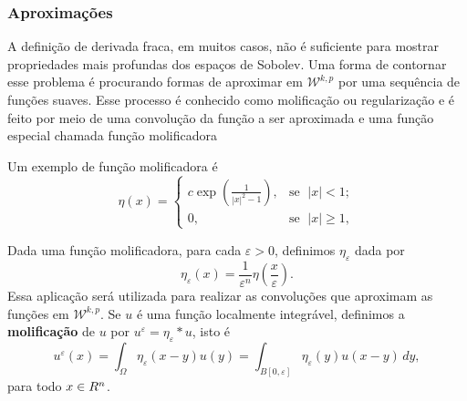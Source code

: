 \documentclass[xcolor=dvipsnames, aspectratio=169, 10pt]{beamer}
\let\mathbb\relax
\newcommand{\bR}{\mathbb{R}}
\newcommand{\cW}{\mathcal{W}}
\begin{document}
\begin{frame}
    \frametitle{Aproximações}
    A definição de derivada fraca, em muitos casos, não é suficiente para mostrar propriedades mais
    profundas dos espaços de Sobolev. Uma forma de contornar esse problema é procurando formas
    de aproximar em $\cW^{k,p}$ por uma sequência de funções suaves. Esse processo é conhecido como
    molificação ou regularização e é feito por meio de uma convolução da função a ser aproximada e
    uma função especial chamada função molificadora \pause

    Um exemplo de função molificadora é
    \begin{equation} \label{eq:molificador-friedrich}
        \eta(x) =
        \left\{
            \begin{array}{lr}
                c \exp \left( \frac{1}{|x|^2 - 1} \right), &\! \text{se }\; |x| < 1;\\
                0, &\!\text{se }\; |x| \geqslant 1,
            \end{array}
        \right.
    \end{equation}
\end{frame}
\begin{frame}
    Dada uma função molificadora, para cada $\varepsilon > 0$, definimos $\eta_\varepsilon$ dada por
    \[
        \eta_\varepsilon(x) = \frac{1}{\varepsilon^n} \eta \left( \frac{x}{\varepsilon} \right).
    \]
    Essa aplicação será utilizada para realizar as convoluções que aproximam as funções em $\cW^{k,p}$.
    Se $u$ é uma função localmente integrável, definimos a \textbf{molificação} de $u$ por $u^\varepsilon = \eta_\varepsilon * u$, isto é
    \[
        u^\varepsilon(x) = \int_\Omega \eta_\varepsilon(x-y) u(y) = \int_{B[0,\varepsilon]} \eta_\varepsilon(y) u(x-y) \,dy,
    \]
    para todo $x \in \bR^n$.
\end{frame}
\end{document}
